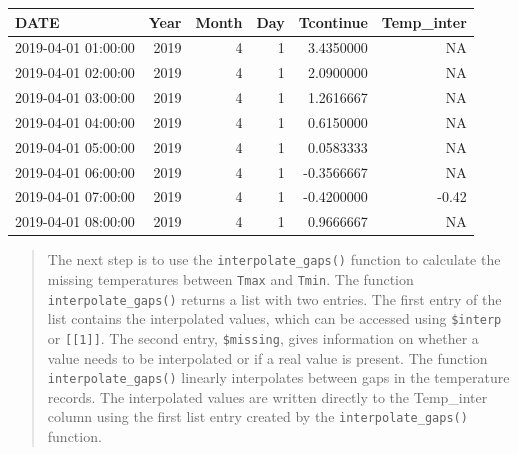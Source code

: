 \documentclass[
]{book}
\newenvironment{Shaded}{\begin{snugshade}}{\end{snugshade}}
\newcommand{\CommentTok}[1]{\textcolor[rgb]{0.56,0.35,0.01}{\textit{#1}}}
\newcommand{\DataTypeTok}[1]{\textcolor[rgb]{0.13,0.29,0.53}{#1}}
\newcommand{\DecValTok}[1]{\textcolor[rgb]{0.00,0.00,0.81}{#1}}
\newcommand{\KeywordTok}[1]{\textcolor[rgb]{0.13,0.29,0.53}{\textbf{#1}}}
\newcommand{\NormalTok}[1]{#1}
\newcommand{\OperatorTok}[1]{\textcolor[rgb]{0.81,0.36,0.00}{\textbf{#1}}}
\newcommand{\StringTok}[1]{\textcolor[rgb]{0.31,0.60,0.02}{#1}}
\begin{document}
\begin{tabular}{l|r|r|r|r|r}
\hline
DATE & Year & Month & Day & Tcontinue & Temp\_inter\\
\hline
2019-04-01 01:00:00 & 2019 & 4 & 1 & 3.4350000 & NA\\
\hline
2019-04-01 02:00:00 & 2019 & 4 & 1 & 2.0900000 & NA\\
\hline
2019-04-01 03:00:00 & 2019 & 4 & 1 & 1.2616667 & NA\\
\hline
2019-04-01 04:00:00 & 2019 & 4 & 1 & 0.6150000 & NA\\
\hline
2019-04-01 05:00:00 & 2019 & 4 & 1 & 0.0583333 & NA\\
\hline
2019-04-01 06:00:00 & 2019 & 4 & 1 & -0.3566667 & NA\\
\hline
2019-04-01 07:00:00 & 2019 & 4 & 1 & -0.4200000 & -0.42\\
\hline
2019-04-01 08:00:00 & 2019 & 4 & 1 & 0.9666667 & NA\\
\hline
\end{tabular}
\endgroup{}

\begin{quote}
The next step is to use the \texttt{interpolate\_gaps()} function to calculate the missing temperatures between \texttt{Tmax} and \texttt{Tmin}. The function \texttt{interpolate\_gaps()} returns a list with two entries. The first entry of the list contains the interpolated values, which can be accessed using \texttt{\$interp} or \texttt{{[}{[}1{]}{]}}. The second entry, \texttt{\$missing}, gives information on whether a value needs to be interpolated or if a real value is present. The function \texttt{interpolate\_gaps()} linearly interpolates between gaps in the temperature records. The interpolated values are written directly to the Temp\_inter column using the first list entry created by the \texttt{interpolate\_gaps()} function.
\end{quote}

\begin{Shaded}
\end{Shaded}
\end{document}
